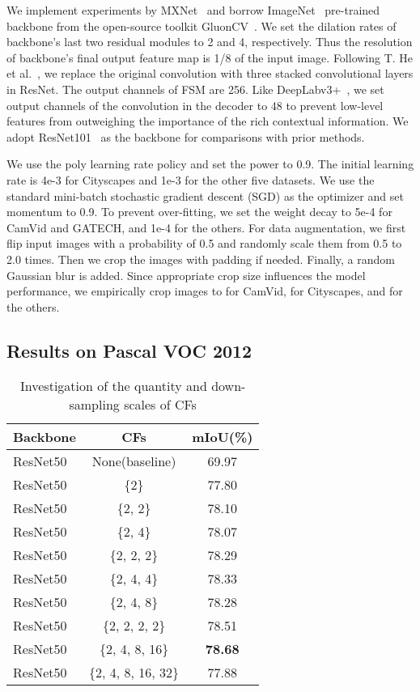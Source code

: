 \documentclass[journal]{IEEEtran}
\begin{document}
We implement experiments by MXNet~\cite{chen2015mxnet} and borrow ImageNet~\cite{russakovsky2015imagenet} pre-trained backbone from the open-source toolkit GluonCV~\cite{guo2019gluoncv}. We set the dilation rates of backbone’s last two residual modules to 2 and 4, respectively. Thus the resolution of backbone’s final output feature map is 1/8 of the input image. Following T. He et al.~\cite{he2019bag}, we replace the original  convolution with three stacked  convolutional layers in ResNet. The output channels of FSM are 256. Like DeepLabv3+~\cite{chen2018encoder}, we set output channels of the  convolution in the decoder to 48 to prevent low-level features from outweighing the importance of the rich contextual information. We adopt ResNet101~\cite{he2016deep} as the backbone for comparisons with prior methods.

We use the poly learning rate policy  and set the power to 0.9. The initial learning rate is 4e-3 for Cityscapes and 1e-3 for the other five datasets. We use the standard mini-batch stochastic gradient descent (SGD) as the optimizer and set momentum to 0.9. To prevent over-fitting, we set the weight decay to 5e-4 for CamVid and GATECH, and 1e-4 for the others. For data augmentation, we first flip input images with a probability of 0.5 and randomly scale them from 0.5 to 2.0 times. Then we crop the images with padding if needed. Finally, a random Gaussian blur is added. Since appropriate crop size influences the model performance, we  empirically crop images to  for CamVid,  for Cityscapes, and  for the others.

\subsection{Results on Pascal VOC 2012}

\begin{table}
\caption{Investigation of the quantity and down-sampling scales of CFs}
\begin{center}
\begin{tabular}{lc|c}
\toprule
\textbf{Backbone} & \textbf{CFs} & \textbf{mIoU(\%)} \\
\midrule\midrule
ResNet50 & None(baseline) & 69.97 \\
ResNet50 & \{2\} & 77.80 \\
ResNet50 & \{2, 2\} & 78.10 \\
ResNet50 & \{2, 4\} & 78.07 \\
ResNet50 & \{2, 2, 2\} & 78.29 \\
ResNet50 & \{2, 4, 4\} & 78.33 \\
ResNet50 & \{2, 4, 8\} & 78.28 \\
ResNet50 & \{2, 2, 2, 2\} & 78.51 \\
ResNet50 & \{2, 4, 8, 16\} & \textbf{78.68} \\
ResNet50 & \{2, 4, 8, 16, 32\} & 77.88 \\
\bottomrule
\end{tabular}
\end{center}
\label{table:ablation_cfs}
\end{table}
\end{document}
